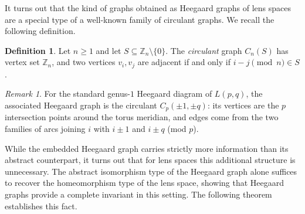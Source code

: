 \documentclass[pdflatex,sn-mathphys-num]{sn-jnl}%
\theoremstyle{plain}
\theoremstyle{definition}
\newtheorem{definition}[theorem]{Definition}
\theoremstyle{remark}
\newtheorem*{remark}{Remark}
\begin{document}
It turns out that the kind of graphs obtained as Heegaard graphs of lens spaces are a special type of a well-known family of circulant graphs. We recall the following definition.

\begin{definition}
Let $n\ge 1$ and let $S\subseteq \mathbb{Z}_n\setminus\{0\}$.  
The \emph{circulant} graph $C_n(S)$ has vertex set $\mathbb{Z}_n$, and two vertices  
$v_i,v_j$ are adjacent if and only if $i-j\pmod n\in S$.
\end{definition}

\begin{remark}\label{rem:lens-circulant}
For the standard genus-$1$ Heegaard diagram of $L(p,q)$, the associated Heegaard graph is the circulant $C_p(\pm 1,\pm q)$: its vertices are the $p$ intersection points around the torus meridian, and edges come from the two families of arcs joining $i$ with $i\pm 1$ and $i\pm q$ (mod $p$).
\end{remark}

While the embedded Heegaard graph carries strictly more information than its abstract counterpart, it turns out that for lens spaces this additional structure is unnecessary. The abstract isomorphism type of the Heegaard graph alone suffices to recover the homeomorphism type of the lens space, showing that Heegaard graphs provide a complete invariant in this setting. The following theorem establishes this fact.
\end{document}
